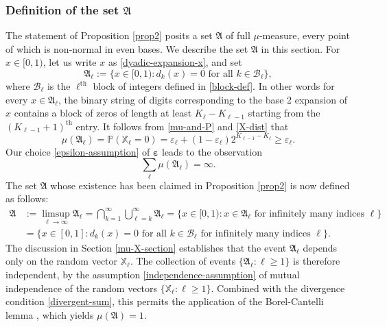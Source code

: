 \documentclass[12pt, twoside]{article}
\theoremstyle{definition}
\numberwithin{equation}{section}
\begin{document}
\subsubsection{Definition of the set $\mathfrak A$} 
The statement of Proposition \ref{prop2} posits a set $\mathfrak A$ of full $\mu$-measure, every point of which is non-normal in even bases. We describe the set $\mathfrak A$ in this section.
\vskip0.1in 
\noindent For $x \in [0,1)$, let us write $x$ as \eqref{dyadic-expansion-x}, 
and set 
\begin{equation} 
\mathfrak A_{\ell} := \bigl\{x \in [0,1) : d_k(x) = 0 \text{ for all } k \in \mathcal B_{\ell}\bigr\},
\end{equation} 
where $\mathcal B_{\ell}$ is the $\ell^{\text{th}}$ block of integers defined in \eqref{block-def}. 
In other words for every $x \in \mathfrak A_{\ell}$, the binary string of digits corresponding to the base 2 expansion of $x$ contains a block of zeros of length at least $K_{\ell} - K_{\ell-1}$ starting from the $(K_{\ell-1}+1)^{\text{th}}$ entry. 
It follows from \eqref{mu-and-P} and \eqref{X-dist} that 
\begin{equation}
\mu(\mathfrak A_{\ell}) = \mathbb P(\mathbb X_{\ell} = 0) = \varepsilon_{\ell} + (1 - \varepsilon_{\ell}) 2^{K_{\ell-1}-K_{\ell}} \geq \varepsilon_{\ell}.
\end{equation}  
Our choice \eqref{epsilon-assumption} of $\pmb{\varepsilon}$ leads to the observation 
\begin{equation} \label{divergent-sum} 
\sum_{\ell} \mu(\mathfrak A_{\ell}) = \infty.
\end{equation} 
The set $\mathfrak A$ whose existence has been claimed in Proposition \ref{prop2} is now defined as follows: 
\begin{align} 
\mathfrak A & := \limsup_{\ell \rightarrow \infty} \mathfrak A_{\ell} = \bigcap_{k=1}^{\infty} \bigcup_{\ell = k}^{\infty} \mathfrak A_{\ell} = \bigl\{x \in [0,1) : x \in \mathfrak A_{\ell} \text{ for infinitely many indices } \ell \bigr\} \nonumber \\ 
&= \bigl\{x \in [0,1] : d_k(x) = 0 \text{ for all $k \in \mathcal B_{\ell}$ for infinitely many indices } \ell \bigr\}.  \label{def-A}
\end{align}  
The discussion in Section \ref{mu-X-section} establishes that the event $\mathfrak A_{\ell}$ depends only on the random vector $\mathbb X_{\ell}$. The collection of events $\{\mathfrak A_{\ell} : \ell \geq 1 \}$ is therefore independent, by the assumption \eqref{independence-assumption} of mutual independence of the random vectors $\{\mathbb X_{\ell} : \ell \geq 1\}$. Combined with the divergence condition \eqref{divergent-sum}, this permits the application of the Borel-Cantelli lemma \cite[Theorem 2.3.6]{d10}, which yields $\mu(\mathfrak A) = 1$. 
\end{document}
